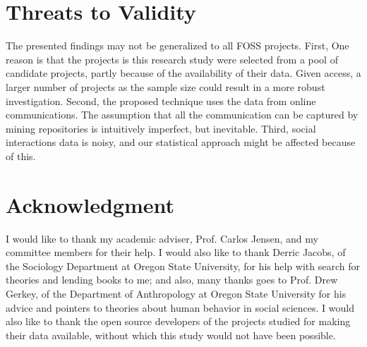 \documentclass[11pt]{report}
\begin{document}
\pagebreak

\section{Threats to Validity}
\label{threatsToValidity}
The presented findings may not be generalized to all FOSS projects. First, One reason is that the projects is this research study were selected from a pool of candidate projects, partly because of the availability of their data. Given access, a larger number of projects as the sample size could result in a more robust investigation. Second, the proposed technique uses the data from online communications. The assumption that all the communication can be captured by mining repositories is intuitively imperfect, but inevitable. Third, social interactions data is noisy, and our statistical approach might be affected because of this. 

\section*{Acknowledgment}
\label{acknowledgments}
I would like to thank my academic adviser, Prof. Carlos Jensen, and my committee members for their help. I would also like to thank Derric Jacobs, of the Sociology Department at Oregon State University, for his help with search for theories and lending books to me; and also, many thanks goes to Prof. Drew Gerkey, of the Department of Anthropology at Oregon State University for his advice and pointers to theories about human behavior in social sciences.
I would also like to thank the open source developers of the projects studied for making their data available, without which this study would not have been possible. \\


%

\pagebreak
\end{document}
